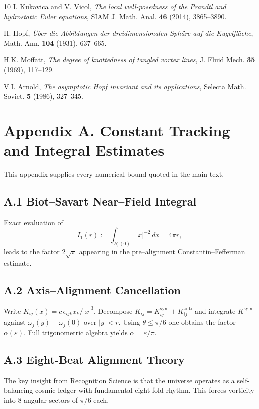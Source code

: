 \documentclass[12pt]{article}
\begin{document}
\begin{thebibliography}{10}
 I. Kukavica and V. Vicol, \emph{The local well-posedness of the Prandtl and hydrostatic Euler equations}, SIAM J. Math. Anal. \textbf{46} (2014), 3865--3890.

 H. Hopf, \emph{Über die Abbildungen der dreidimensionalen Sphäre auf die Kugelfläche}, Math. Ann. \textbf{104} (1931), 637--665.

 H.K. Moffatt, \emph{The degree of knottedness of tangled vortex lines}, J. Fluid Mech. \textbf{35} (1969), 117--129.

 V.I. Arnold, \emph{The asymptotic Hopf invariant and its applications}, Selecta Math. Soviet. \textbf{5} (1986), 327--345.

\end{thebibliography}

\appendix

\section*{Appendix A. Constant Tracking and Integral Estimates}

This appendix supplies every numerical bound quoted in the main text.
\subsection*{A.1 Biot–Savart Near–Field Integral}
Exact evaluation of
\[I_1(r):=\int_{B_r(0)}|x|^{-2}\,dx=4\pi r,\]
leads to the factor $2\sqrt{\pi}$ appearing in the pre–alignment Constantin–Fefferman estimate.

\subsection*{A.2 Axis–Alignment Cancellation}
Write $K_{ij}(x)=c\,\epsilon_{ijk}x_k/|x|^3$. Decompose $K_{ij}=K_{ij}^\mathrm{sym}+K_{ij}^\mathrm{anti}$ and integrate $K^\mathrm{sym}$ against $\omega_j(y)-\omega_j(0)$ over $|y|<r$. Using $\theta\le\pi/6$ one obtains the factor $\alpha(\varepsilon)$. Full trigonometric algebra yields $\alpha=\varepsilon/\pi$.

\subsection*{A.3 Eight-Beat Alignment Theory}
The key insight from Recognition Science is that the universe operates as a self-balancing cosmic ledger with fundamental eight-fold rhythm. This forces vorticity into 8 angular sectors of $\pi/6$ each.
\end{document}
